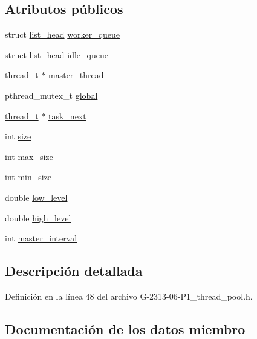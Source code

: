 \subsection*{Atributos públicos}
\begin{DoxyCompactItemize}
\item 
struct \hyperlink{structlist__head}{list\+\_\+head} \hyperlink{structthread__pool__t_a44640e57780a54d437d7589b1c754ac1}{worker\+\_\+queue}
\item 
struct \hyperlink{structlist__head}{list\+\_\+head} \hyperlink{structthread__pool__t_a38a9fa0d0ea1060d5bbff8421a92c1c7}{idle\+\_\+queue}
\item 
\hyperlink{structthread__t}{thread\+\_\+t} $\ast$ \hyperlink{structthread__pool__t_a9ad8218717dde39eef701a8bce5ca0a1}{master\+\_\+thread}
\item 
pthread\+\_\+mutex\+\_\+t \hyperlink{structthread__pool__t_aaa6e0a9d9c28c3f9be7eccbe8003af23}{global}
\item 
\hyperlink{structthread__t}{thread\+\_\+t} $\ast$ \hyperlink{structthread__pool__t_a00ce5a27204f85e624552f7448ba7093}{task\+\_\+next}
\item 
int \hyperlink{structthread__pool__t_a3185c157636a142415699a20042d6dd8}{size}
\item 
int \hyperlink{structthread__pool__t_a978e7f94032dad6e7a373e7bc1896237}{max\+\_\+size}
\item 
int \hyperlink{structthread__pool__t_a80aa1805a11e2e6e2bf5811fda0ffc26}{min\+\_\+size}
\item 
double \hyperlink{structthread__pool__t_a815792ab9c936b06d46ef3e149e5fd88}{low\+\_\+level}
\item 
double \hyperlink{structthread__pool__t_aa771fc181f63c16346fff1c7eb0d9014}{high\+\_\+level}
\item 
int \hyperlink{structthread__pool__t_ae3eaf8d90ef550166e595286a6175d14}{master\+\_\+interval}
\end{DoxyCompactItemize}


\subsection{Descripción detallada}


Definición en la línea 48 del archivo G-\/2313-\/06-\/\+P1\+\_\+thread\+\_\+pool.\+h.



\subsection{Documentación de los datos miembro}
\hypertarget{structthread__pool__t_aaa6e0a9d9c28c3f9be7eccbe8003af23}{}
